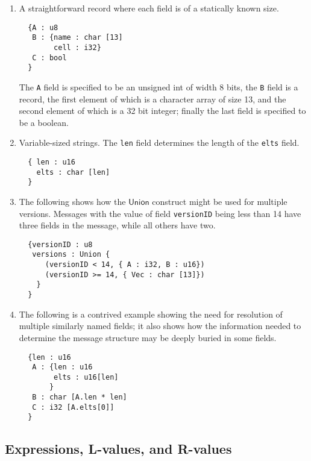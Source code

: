 \documentclass[svgnames]{llncs}
\newcommand{\konst}[1]{\ensuremath{\mathsf{#1}}}
\begin{document}
\begin{enumerate}

\item A straightforward record where each field is of a statically known size.

\begin{verbatim}
  {A : u8
   B : {name : char [13]
        cell : i32}
   C : bool
  }
\end{verbatim}

The \verb+A+ field is specified to be an unsigned int of width 8 bits,
the \verb+B+ field is a record, the first element of which is a
character array of size 13, and the second element of which is a 32
bit integer; finally the last field is specified to be a
boolean.

\item Variable-sized strings. The \verb+len+ field determines the
 length of the \verb+elts+ field.

\begin{verbatim}
  { len : u16
    elts : char [len]
  }
\end{verbatim}


\item The following shows how the \konst{Union} construct might be
  used for multiple versions.  Messages with the value of field
  \verb+versionID+ being less than 14 have three fields in the message,
  while all others have two.

\begin{verbatim}
  {versionID : u8
   versions : Union {
      (versionID < 14, { A : i32, B : u16})
      (versionID >= 14, { Vec : char [13]})
    }
  }
\end{verbatim}

\item The following is a contrived example showing the need for
  resolution of multiple similarly named fields; it also shows how the
  information needed to determine the message structure may be deeply
  buried in some fields.

\begin{verbatim}
  {len : u16
   A : {len : u16
        elts : u16[len]
       }
   B : char [A.len * len]
   C : i32 [A.elts[0]]
  }
\end{verbatim}

\end{enumerate}

\subsection{Expressions, L-values, and R-values}
\end{document}
